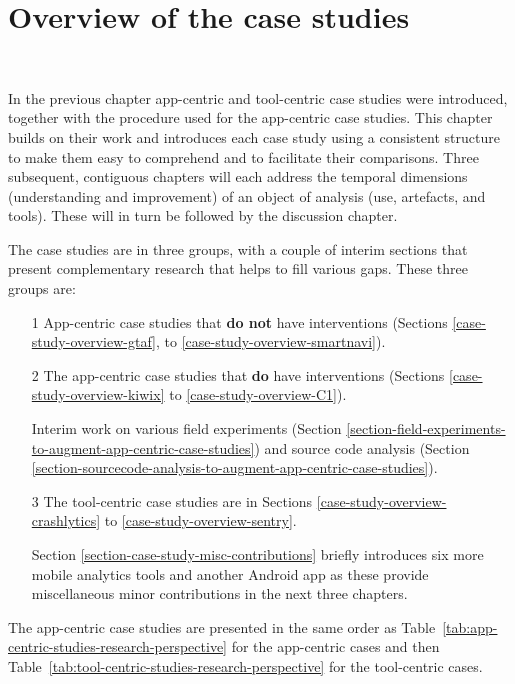 \chapter{Overview of the case studies}~\label{chapter-case-studies-overview}

In the previous chapter app-centric and tool-centric case studies were introduced, together with the procedure used for the app-centric case studies. This chapter builds on their work and introduces each case study using a consistent structure to make them easy to comprehend and to facilitate their comparisons. Three subsequent, contiguous chapters will each address the temporal dimensions (understanding and improvement) of an object of analysis (use, artefacts, and tools). These will in turn be followed by the discussion chapter.

The case studies are in three groups, with a couple of interim sections that present complementary research that helps to fill various gaps. These three groups are: 
\begin{enumerate}
    \itemsep0em
    \item[1] App-centric case studies that \textbf{do not} have interventions (Sections \ref{case-study-overview-gtaf}, to \ref{case-study-overview-smartnavi}).
    \item[2] The app-centric case studies that \textbf{do} have interventions (Sections \ref{case-study-overview-kiwix} to \ref{case-study-overview-C1}).
    \item[ ] Interim work on various field experiments (Section \ref{section-field-experiments-to-augment-app-centric-case-studies}) and source code analysis (Section \ref{section-sourcecode-analysis-to-augment-app-centric-case-studies}).
    \item[3] The tool-centric case studies are in Sections \ref{case-study-overview-crashlytics} to \ref{case-study-overview-sentry}.
    \item[ ] Section \ref{section-case-study-misc-contributions} briefly introduces six more mobile analytics tools and another Android app as these provide miscellaneous minor contributions in the next three chapters.
\end{enumerate}

The app-centric case studies are presented in the same order as Table~\ref{tab:app-centric-studies-research-perspective} for the app-centric cases and then Table~\ref{tab:tool-centric-studies-research-perspective} for the tool-centric cases. 

